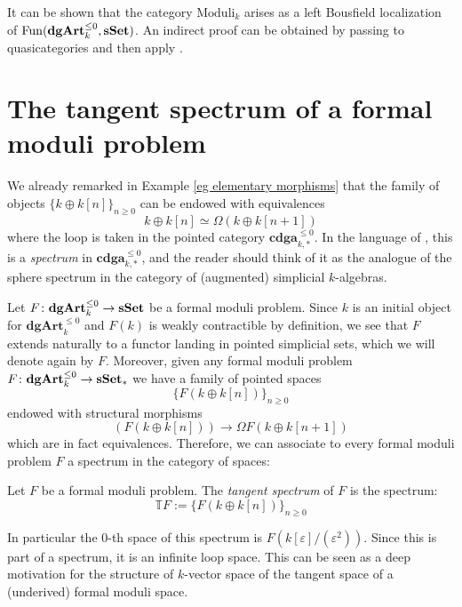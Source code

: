 \begin{refsection}
\begin{rmk}
It can be shown that the category $\mathrm{Moduli}_k$ arises as a left Bousfield localization of $\mathrm{Fun}(\mathbf{dgArt}_k^{\le 0}, \mathbf{sSet})$. An indirect proof can be obtained by passing to quasicategories and then apply \cite[Propositions 5.5.4.18 and 5.5.4.19]{htt}.
\end{rmk}

\section{The tangent spectrum of a formal moduli problem}

We already remarked in Example \ref{eg elementary morphisms} that the family of objects $\{k \oplus k[n]\}_{n \ge 0}$ can be endowed with equivalences
\[
k \oplus k[n] \simeq \Omega( k \oplus k[n+1] )
\]
where the loop is taken in the pointed category $\mathbf{cdga}_{k,*}^{\le 0}$. In the language of \cite{ha}, this is a \emph{spectrum} in $\mathbf{cdga}_{k,*}^{\le 0}$, and the reader should think of it as the analogue of the sphere spectrum in the category of (augmented) simplicial $k$-algebras.

Let $F \colon \mathbf{dgArt}_k^{\le 0} \to \mathbf{sSet}$ be a formal moduli problem. Since $k$ is an initial object for $\mathbf{dgArt}_k^{\le 0}$ and $F(k)$ is weakly contractible by definition, we see that $F$ extends naturally to a functor landing in pointed simplicial sets, which we will denote again by $F$. Moreover, given any formal moduli problem $F \colon \mathbf{dgArt}_k^{\le 0} \to \mathbf{sSet}_*$ we have a family of pointed spaces
\[
\{F(k \oplus k[n])\}_{n \ge 0}
\]
endowed with structural morphisms
\[
(F(k \oplus k[n])) \to \Omega F(k \oplus k[n+1])
\]
which are in fact equivalences. Therefore, we can associate to every formal moduli problem $F$ a spectrum in the category of spaces:

\begin{defin}
Let $F$ be a formal moduli problem. The \emph{tangent spectrum} of $F$ is the spectrum:
\[
\mathbb T F := \{F(k \oplus k[n])\}_{n \ge 0}
\]
\end{defin}

\begin{rmk}
In particular the $0$-th space of this spectrum is $F(k[\varepsilon]/(\varepsilon^2))$. Since this is part of a spectrum, it is an infinite loop space. This can be seen as a deep motivation for the structure of $k$-vector space of the tangent space of a (underived) formal moduli space.
\end{rmk}


\end{refsection}
